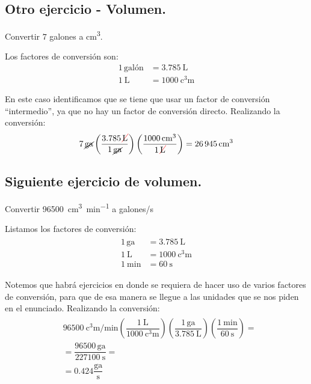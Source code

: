 \documentclass[14pt]{extarticle}
\newcommand{\Cancel}[2][black]{{\color{#1}\cancel{\color{black}#2}}}
\begin{document}
\subsection{Otro ejercicio - Volumen.}
Convertir $7$ galones a \unit{\cubic\centi\meter}.

Los factores de conversión son:
\begin{align*}
1 \, \text{galón} &= \SI{3.785}{\liter} \\[0.5em]
\SI{1}{\liter} &= \SI{1000}{\cubic\centi\meter}
\end{align*}

En este caso identificamos que se tiene que usar un factor de conversión \enquote{intermedio}, ya que no hay un factor de conversión directo. Realizando la conversión:
\begin{eqnarray*}
\begin{aligned}
7 \, \text{\Cancel{ga}}  \left( \dfrac{\num{3.785} \, \Cancel[red]{\unit{\liter}}}{1 \, \text{\Cancel{ga}}} \right)  \left( \dfrac{\SI{1000}{\cubic\centi\meter}}{\num{1} \, \Cancel[red]{\unit{\liter}}} \right) =  \SI{26945}{\cubic\centi\meter}
\end{aligned}
\end{eqnarray*}

\subsection{Siguiente ejercicio de volumen.}

Convertir \SI{96500}{\cubic\centi\meter\per\minute} a  galones/s

\vspace*{0.5cm}
Listamos los factores de conversión:
\begin{eqnarray*}
\begin{aligned}
1 \, \text{ga} &= \SI{3.785}{\liter} \\[0.5em] 
\SI{1}{\liter} &= \SI{1000}{\cubic\centi\meter} \\[0.5em] 
\SI{1}{\minute} &= \SI{60}{\second}
\end{aligned}
\end{eqnarray*}

Notemos que habrá ejercicios en donde se requiera de hacer uso de varios factores de conversión, para que de esa manera se llegue a las unidades que se nos piden en el enunciado. Realizando la conversión:
\begin{eqnarray*}
\begin{aligned}
&\SI[per-mode=fraction]{96500}{\cubic\centi\meter\per\minute}   \left( \dfrac{\SI{1}{\liter}}{\SI{1000}{\cubic\centi\meter}} \right)  \left( \dfrac{1 \, \text{ga}}{\SI{3.785}{\liter}} \right)  \left(  \dfrac{\SI{1}{\minute}}{\SI{60}{\second}} \right) = \\[1em] 
&= \dfrac{96500 \, \text{ga}}{\SI{227100}{\second}} = \\[1em] 
&= 0.424 \dfrac{\text{ga}}{\unit{\second}}
\end{aligned}
\end{eqnarray*}
\end{document}
